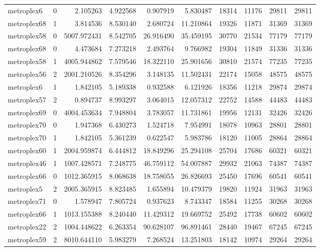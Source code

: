 \begin{longtable}{|l|r|r|r|r|r|r|r|r|r|}
metroplex6 & 0 & 2.105263 & 4.922568 & 0.907919 & 5.830487 & 18314 & 11176 & 29811 & 29811 \\
metroplex68 & 1 & 3.814536 & 8.530140 & 2.680724 & 11.210864 & 19326 & 11871 & 31369 & 31369 \\
metroplex58 & 0 & 5007.972431 & 8.542705 & 26.916490 & 35.459195 & 30770 & 21534 & 77179 & 77179 \\
metroplex68 & 0 & 4.473684 & 7.273218 & 2.493764 & 9.766982 & 19304 & 11849 & 31336 & 31336 \\
metroplex58 & 1 & 4005.944862 & 7.579546 & 18.322110 & 25.901656 & 30810 & 21574 & 77235 & 77235 \\
metroplex56 & 2 & 2001.210526 & 8.354296 & 3.148135 & 11.502431 & 22174 & 15058 & 48575 & 48575 \\
metroplex6 & 1 & 1.842105 & 5.189338 & 0.932588 & 6.121926 & 18356 & 11218 & 29874 & 29874 \\
metroplex57 & 2 & 0.894737 & 8.993297 & 3.064015 & 12.057312 & 22752 & 14588 & 44483 & 44483 \\
metroplex69 & 0 & 4004.453634 & 7.948804 & 3.783057 & 11.731861 & 19956 & 12131 & 32426 & 32426 \\
metroplex70 & 0 & 1.947368 & 6.430273 & 1.524718 & 7.954991 & 18078 & 10963 & 28801 & 28801 \\
metroplex70 & 1 & 1.842105 & 5.361239 & 0.622547 & 5.983786 & 18120 & 11005 & 28864 & 28864 \\
metroplex60 & 1 & 2004.959874 & 6.444812 & 18.849296 & 25.294108 & 25704 & 17686 & 60321 & 60321 \\
metroplex46 & 1 & 1007.428571 & 7.248775 & 46.759112 & 54.007887 & 29932 & 21063 & 74387 & 74387 \\
metroplex66 & 0 & 1012.365915 & 8.068638 & 18.758055 & 26.826693 & 25450 & 17696 & 60541 & 60541 \\
metroplex5 & 2 & 2005.365915 & 8.823485 & 1.655894 & 10.479379 & 19820 & 11924 & 31963 & 31963 \\
metroplex71 & 0 & 1.578947 & 7.805724 & 0.937623 & 8.743347 & 18584 & 11255 & 30268 & 30268 \\
metroplex66 & 1 & 1013.155388 & 8.240440 & 11.429312 & 19.669752 & 25492 & 17738 & 60602 & 60602 \\
metroplex22 & 2 & 1004.448622 & 6.263354 & 90.628107 & 96.891461 & 28440 & 19467 & 67245 & 67245 \\
metroplex59 & 2 & 8010.644110 & 5.983279 & 7.268524 & 13.251803 & 18142 & 10974 & 29264 & 29264 \\

\end{longtable}
